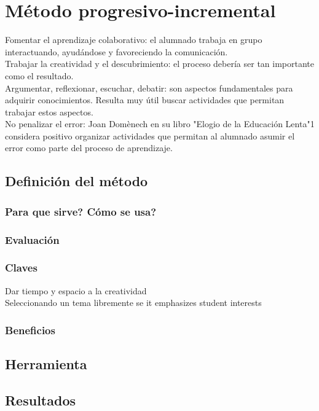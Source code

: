 \chapter{M\'etodo progresivo-incremental}
Fomentar el aprendizaje colaborativo: el alumnado trabaja en grupo interactuando, ayud\'andose y favoreciendo la comunicaci\'on.\\


Trabajar la creatividad y el descubrimiento: el proceso debería ser tan importante como el resultado.\\
Argumentar, reflexionar, escuchar, debatir: son aspectos fundamentales para adquirir conocimientos. Resulta muy útil buscar actividades que permitan 
trabajar estos aspectos.\\
No penalizar el error: Joan Domènech en su libro  "Elogio de la Educación Lenta"1 considera positivo organizar actividades que permitan al alumnado asumir 
el error como parte del proceso de aprendizaje.



\section{Definici\'on del m\'etodo}

\subsection{Para que sirve? C\'omo se usa?}
\subsection{Evaluaci\'on}
\subsection{Claves}
Dar tiempo y espacio a la creatividad\\
Seleccionando un tema libremente se it emphasizes student interests

\subsection{Beneficios}



\section{Herramienta}\label{ch1:opts}

\section{Resultados}

